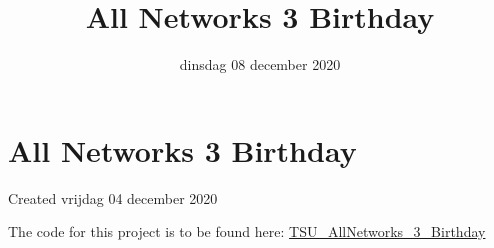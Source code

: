 \documentclass{scrartcl}
\title{All Networks 3 Birthday}
\date{dinsdag 08 december 2020}
\author{}
\begin{document}
\maketitle

		\section{All Networks 3 Birthday}

Created vrijdag 04 december 2020



The code for this project is to be found here: \href{https://colab.research.google.com/drive/1_DKPtHi231TMalsj-uaBLytjcX2DuyV4#scrollTo=vmsTN_T4xoXP}{TSU\_AllNetworks\_3\_Birthday}
\end{document}
